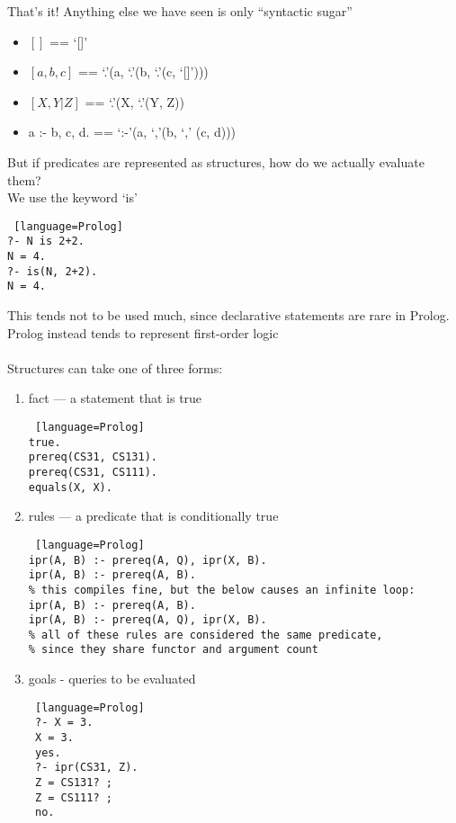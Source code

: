 \documentclass[../../lecture_notes.tex]{subfiles}
\begin{document}
\noindent That’s it! Anything else we have seen is only “syntactic sugar”
\begin{itemize} [itemsep=0mm]
	\item $[]$ == ‘[]’
	\item $[a, b, c]$ == ‘.’(a, ‘.’(b, ‘.’(c, ‘[]’)))
 	\item $[X, Y|Z]$ == ‘.’(X, ‘.’(Y, Z))
 	\item a :- b, c, d. == ‘:-’(a, ‘,’(b, ‘,’ (c, d)))
\end{itemize}
\noindent But if predicates are represented as structures, how do we actually evaluate them?\\
\indent We use the keyword ‘is’
\begin{lstlisting} [language=Prolog]
?- N is 2+2.
N = 4.
?- is(N, 2+2).
N = 4.
\end{lstlisting}
\noindent This tends not to be used much, since declarative statements are rare in Prolog.\\
Prolog instead tends to represent first-order logic\\
\\
Structures can take one of three forms:
\begin{enumerate}
\item fact — a statement that is true
\begin{lstlisting} [language=Prolog]
true.
prereq(CS31, CS131).
prereq(CS31, CS111).
equals(X, X).
\end{lstlisting}
\item rules — a predicate that is conditionally true
\begin{lstlisting} [language=Prolog]
ipr(A, B) :- prereq(A, Q), ipr(X, B).
ipr(A, B) :- prereq(A, B).
% this compiles fine, but the below causes an infinite loop:
ipr(A, B) :- prereq(A, B).
ipr(A, B) :- prereq(A, Q), ipr(X, B).
% all of these rules are considered the same predicate, 
% since they share functor and argument count
\end{lstlisting}
\item goals - queries to be evaluated
\begin{lstlisting} [language=Prolog]
 ?- X = 3.
 X = 3.
 yes.
 ?- ipr(CS31, Z).
 Z = CS131? ;
 Z = CS111? ;
 no.
\end{lstlisting} \medskip
\end{enumerate}
\end{document}
